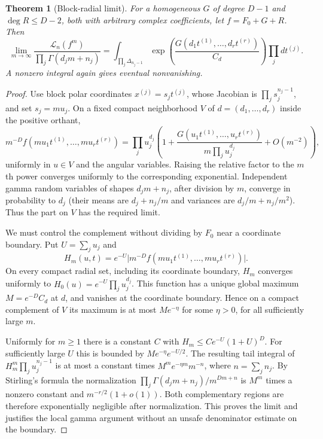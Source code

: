 \documentclass[11pt]{article}
\numberwithin{equation}{section}
\newtheorem{theorem}{Theorem}[section]
\theoremstyle{definition}
\theoremstyle{remark}
\newcommand{\Lcal}{\mathcal L}
\begin{document}
\begin{theorem}[Block-radial limit]\label{thm:block-limit}
For a homogeneous $G$ of degree $D-1$ and $\deg R\le D-2$, both with
arbitrary complex coefficients, let $f=F_0+G+R$. Then
\begin{equation}\label{eq:block-limit}
 \lim_{m\to\infty}\frac{\Lcal_n(f^m)}{\prod_j\Gamma(d_jm+n_j)}
 =\int_{\prod_j\Delta_{n_j-1}}
  \exp\!\left(\frac{G(d_1t^{(1)},\ldots,d_rt^{(r)})}{C_d}\right)
  \prod_jdt^{(j)}.
\end{equation}
A nonzero integral again gives eventual nonvanishing.
\end{theorem}
\begin{proof}
Use block polar coordinates $x^{(j)}=s_jt^{(j)}$, whose Jacobian is
$\prod_js_j^{n_j-1}$, and set $s_j=mu_j$. On a fixed compact neighborhood
$V$ of $d=(d_1,\ldots,d_r)$ inside the positive orthant,
\[
 m^{-D}f(mu_1t^{(1)},\ldots,mu_rt^{(r)})
 =\prod_ju_j^{d_j}\left(1+\frac{G(u_1t^{(1)},\ldots,u_rt^{(r)})}
 {m\prod_ju_j^{d_j}}+O(m^{-2})\right),
\]
uniformly in $u\in V$ and the angular variables. Raising the relative
factor to the $m$th power converges uniformly to the corresponding
exponential. Independent gamma random variables of shapes $d_jm+n_j$,
after division by $m$, converge in probability to $d_j$ (their means are
$d_j+n_j/m$ and variances are $d_j/m+n_j/m^2$). Thus the part on $V$ has
the required limit.

We must control the complement without dividing by $F_0$ near a coordinate
boundary. Put $U=\sum_ju_j$ and
\[
 H_m(u,t)=e^{-U}\bigl|m^{-D}f(mu_1t^{(1)},\ldots,mu_rt^{(r)})\bigr|.
\]
On every compact radial set, including its coordinate boundary,
$H_m$ converges uniformly to
$H_0(u)=e^{-U}\prod_ju_j^{d_j}$. This function has a unique global maximum
$M=e^{-D}C_d$ at $d$, and vanishes at the coordinate boundary. Hence on a
compact complement of $V$ its maximum is at most $M e^{-\eta}$ for some
$\eta>0$, for all sufficiently large $m$.

Uniformly for $m\ge1$ there is a constant $C$ with
$H_m\le C e^{-U}(1+U)^D$. For sufficiently large $U$ this is bounded by
$M e^{-\eta}e^{-U/2}$. The resulting tail integral of
$H_m^m\prod_ju_j^{n_j-1}$ is at most a constant times
$M^m e^{-\eta m}m^{-n}$, where $n=\sum_jn_j$.
By Stirling's formula the normalization
$\prod_j\Gamma(d_jm+n_j)/m^{Dm+n}$ is $M^m$ times a nonzero constant and
$m^{-r/2}(1+o(1))$. Both complementary regions are therefore exponentially
negligible after normalization. This proves the limit and justifies the
local gamma argument without an unsafe denominator estimate on the boundary.
\end{proof}
\end{document}
